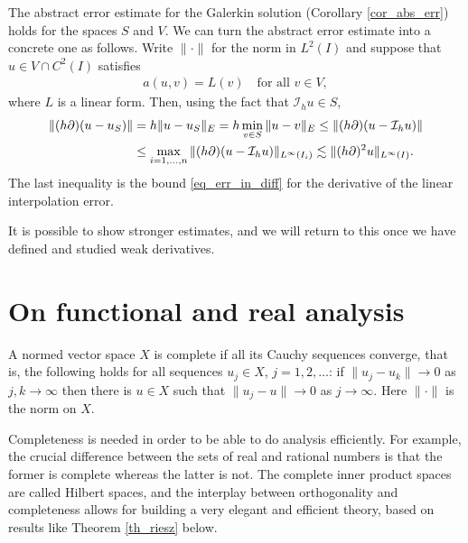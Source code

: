 \documentclass[12pt,oneside]{amsart}
\def\I{\mathcal I}
\begin{document}
The abstract error estimate for the Galerkin solution (Corollary \ref{cor_abs_err}) holds for the spaces $S$ and $V$. 
We can turn the abstract error estimate into a concrete one as follows. Write $\|\cdot\|$ for the norm in $L^2(I)$ and suppose that $u \in V \cap C^2(I)$ satisfies
    \begin{align*}
a(u, v) = L(v) \quad \text{for all $v \in V$},
    \end{align*}
where $L$ is a linear form.
Then, using the fact that $\I_h u \in S$,
    \begin{align}\label{eq_err_peek}
\|(h\partial)(u-u_S)\|
&= 
h\|u-u_S\|_E 
= 
h \min_{v \in S}\|u-v\|_E
\le 
\|(h\partial)(u-\I_h u)\|
\\\notag&\le
\max_{i=1,\dots,n}\|(h\partial)(u - \I_h u)\|_{L^\infty(I_i)} 
\lesssim\|(h \partial)^2 u\|_{L^\infty(I)}.
    \end{align}
The last inequality is the bound \eqref{eq_err_in_diff} for the derivative of the linear interpolation error.

It is possible to show stronger estimates, and we will return to this once we have defined and studied weak derivatives. 

\section{On functional and real analysis}

\begin{definition}[Completeness]\label{def_complete}
A normed vector space $X$ is complete if all its Cauchy sequences converge, that is,
the following holds for all sequences $u_j \in X$, $j=1,2,\dots$: 
if $\|u_j - u_k\| \to 0$ as $j,k \to \infty$
then there is $u \in X$ such that $\|u_j - u\| \to 0$ as $j \to \infty$. Here $\|\cdot\|$ is the norm on $X$.
\end{definition}

Completeness is needed in order to be able to do analysis efficiently. For example, the crucial difference between the sets of real and rational numbers is that the former is complete whereas the latter is not. 
The complete inner product spaces are called Hilbert spaces,
and the interplay between orthogonality and completeness allows for building a very elegant and efficient theory, based on results like Theorem \ref{th_riesz} below.
\end{document}
